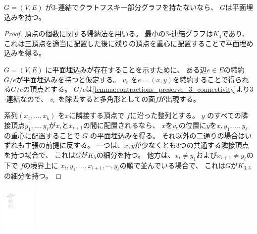 \begin{lemma}\label{lemma:tutte}
$G = (V, E)$ が$3$-連結でクラトフスキー部分グラフを持たないなら、
$G$は平面埋込みを持つ。
\end{lemma}



\vspace*{-\intextsep}
\begin{paracol}{2}

\begin{proof}
頂点の個数に関する帰納法を用いる。
最小の$3$-連結グラフは$K_4$であり、
これは三頂点を適当に配置した後に残りの頂点を重心に配置することで平面埋め込みを得る。

$G = (V, E)$ に平面埋込みが存在することを示すために、
ある辺$e\in E$の縮約$G / e$が平面埋込みを持つと仮定する。
$v_e$ を$e=(x,y)$を縮約することで得られる$G / e$の頂点とする。
$G/e$は\cref{lemma:contractions_preserve_3_connectivity}より$3$-連結なので、
$v_e$ を除去すると多角形としての面$f$が出現する。

系列$(x_1, \ldots, x_k)$ を$x$に隣接する頂点で
$f$に沿った整列とする。
$y$ のすべての隣接頂点$y_1, \ldots, y_\ell$が$x_i$と$x_{i+1}$の間に配置されるなら、
$x$を$v_e$の位置に$y$を$x, y_1, \ldots, y_\ell$ の重心に配置することで
$G$ の平面埋込みを得る。
それ以外の二通りの場合はいずれも主張の前提に反する。
一つは、$x, y$が少なくとも3つの共通する隣接頂点を持つ場合で、
これは$G$が$K_5$の細分を持つ。
他方は、$x_i \neq y_1$および$x_{i+1} \neq y_\ell$の下で
$f$の境界上に
$x_i, y_1, \ldots, x_{i+1}, \cdots, y_\ell$の順で並んでいる場合で、
これは$G$が$K_{3,3}$の細分を持つ。
\end{proof}


\switchcolumn
\vspace{0.5\intextsep}
\centering
\includegraphics[width=0.12\textwidth]{figures/convex_embedding.pdf}
\end{paracol}

